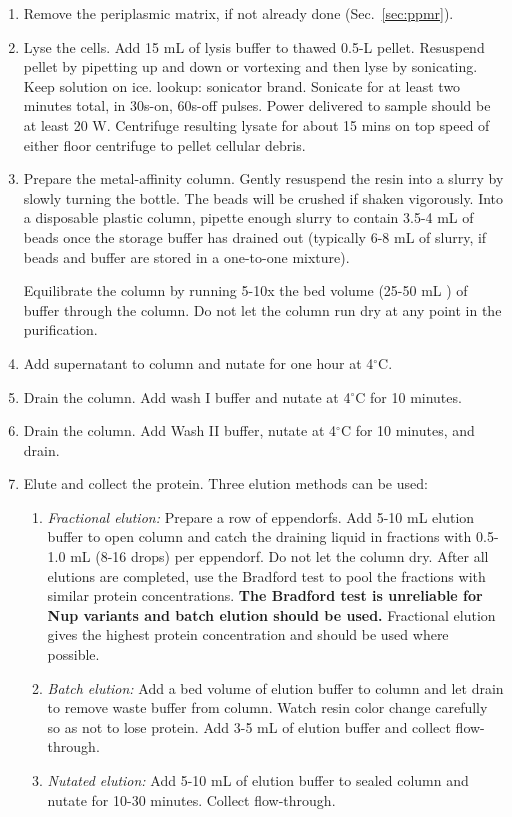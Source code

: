 \begin{enumerate}
\item Remove the periplasmic matrix, if not already done (Sec.~\ref{sec:ppmr}).

\item Lyse the cells. Add 15 mL of lysis buffer to thawed 0.5-L pellet. Resuspend pellet by pipetting up and down or vortexing and then lyse by sonicating.  Keep solution on ice. lookup: sonicator brand.  Sonicate for at least two minutes total, in 30s-on, 60s-off pulses.  Power delivered to sample should be at least 20 W.  Centrifuge resulting lysate for about 15 mins on top speed of either floor centrifuge to pellet cellular debris.
 
\item Prepare the metal-affinity column.  Gently resuspend the resin into a slurry by slowly turning the bottle.  The beads will be crushed if shaken vigorously. Into a disposable plastic column, pipette enough slurry to contain 3.5-4 mL of beads once the storage buffer has drained out (typically 6-8 mL of slurry, if beads and buffer are stored in a one-to-one mixture).
 
Equilibrate the column by running 5-10x the bed volume (25-50 mL ) of buffer through the column.  Do not let the column run dry at any point in the purification.
 
\item Add supernatant to column and nutate for one hour at 4$^\circ$C.

\item Drain the column. Add wash I buffer and nutate at 4$^\circ$C for 10 minutes.

\item Drain the column. Add Wash II buffer, nutate at 4$^\circ$C for 10 minutes, and drain.

\item Elute and collect the protein.  Three elution methods can be used:
\begin{enumerate}
\item \textit{Fractional elution:} Prepare a row of eppendorfs.  Add 5-10 mL elution buffer to open column and catch the draining liquid in fractions with 0.5-1.0 mL (8-16 drops) per eppendorf.  Do not let the column dry.  After all elutions are completed, use the Bradford test to pool the fractions with similar protein concentrations.  \textbf{The Bradford test is unreliable for Nup variants and batch elution should be used.} Fractional elution gives the highest protein concentration and should be used where possible.
\item \textit{Batch elution:} Add a bed volume of elution buffer to column and let drain to remove waste buffer from column.  Watch resin color change carefully so as not to lose protein.  Add 3-5 mL of elution buffer and collect flow-through.
\item \textit{Nutated elution:} Add 5-10 mL of elution buffer to sealed column and nutate for 10-30 minutes.  Collect flow-through.
\end{enumerate}


\end{enumerate}
